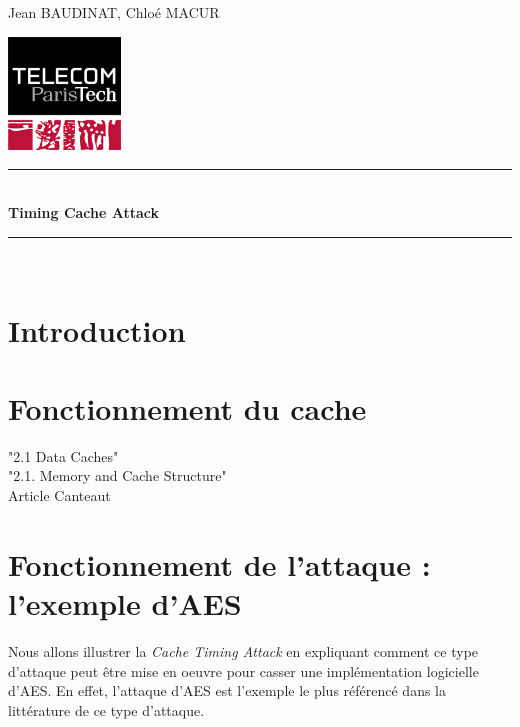 \documentclass[a4paper,11pt]{article}
\newcommand{\HRule}{\rule{\linewidth}{0.5mm}}
\newcommand{\reporttitle}{Timing Cache Attack}
\newcommand{\reportauthor}{Jean BAUDINAT, Chloé MACUR}
\begin{document}
	

\begin{center}

\begin{minipage}[t]{0.4\textwidth}
  \begin{flushleft} \large
    \reportauthor
  \vfill
  \end{flushleft}
\end{minipage}
\begin{minipage}[t]{0.5\textwidth}
  \begin{flushright}
  \includegraphics [width=30mm]{figures/tpt.jpg} \\[0.5cm]
  \end{flushright}
\end{minipage}
\HRule \\[0.5cm]
{\huge \bfseries \reporttitle}\\[0.3cm]
\HRule \\[1.5cm]

\end{center}

\section*{Introduction} %

\section{Fonctionnement du cache}

"2.1 Data Caches"~\cite{brumley2009cache}\\
"2.1. Memory and Cache Structure"~\cite{tromer2010efficient}\\
Article Canteaut~\cite{canteaut2006understanding}

\section{Fonctionnement de l'attaque : l'exemple d'AES}

Nous allons illustrer la \emph{Cache Timing Attack} en expliquant comment ce type d'attaque peut être mise en oeuvre pour casser une implémentation logicielle d'AES. En effet, l'attaque d'AES est l'exemple le plus référencé dans la littérature de ce type d'attaque.
\end{document}
